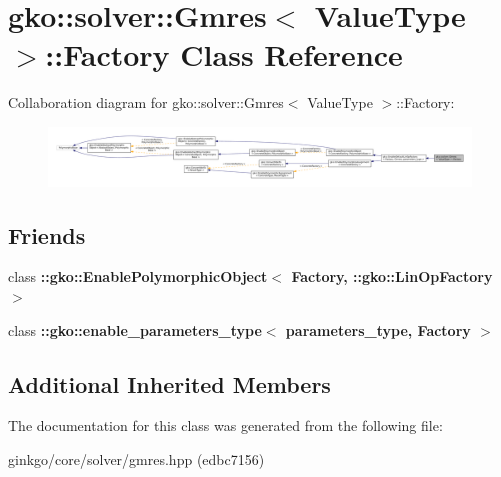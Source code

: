 \hypertarget{classgko_1_1solver_1_1Gmres_1_1Factory}{}\section{gko\+:\+:solver\+:\+:Gmres$<$ Value\+Type $>$\+:\+:Factory Class Reference}
\label{classgko_1_1solver_1_1Gmres_1_1Factory}


Collaboration diagram for gko\+:\+:solver\+:\+:Gmres$<$ Value\+Type $>$\+:\+:Factory\+:
\nopagebreak
\begin{figure}[H]
\begin{center}
\leavevmode
\includegraphics[width=350pt]{classgko_1_1solver_1_1Gmres_1_1Factory__coll__graph}
\end{center}
\end{figure}
\subsection*{Friends}
\begin{DoxyCompactItemize}
\item 
\mbox{\label{classgko_1_1solver_1_1Gmres_1_1Factory_a27e9bbc94a1c1c59f40833153eda8f78}} 
class {\bfseries \+::gko\+::\+Enable\+Polymorphic\+Object$<$ Factory, \+::gko\+::\+Lin\+Op\+Factory $>$}
\item 
\mbox{\label{classgko_1_1solver_1_1Gmres_1_1Factory_a0d176cbd42d6214e11aee8c30ca256fc}} 
class {\bfseries \+::gko\+::enable\+\_\+parameters\+\_\+type$<$ parameters\+\_\+type, Factory $>$}
\end{DoxyCompactItemize}
\subsection*{Additional Inherited Members}


The documentation for this class was generated from the following file\+:\begin{DoxyCompactItemize}
\item 
ginkgo/core/solver/gmres.\+hpp (edbc7156)\end{DoxyCompactItemize}
